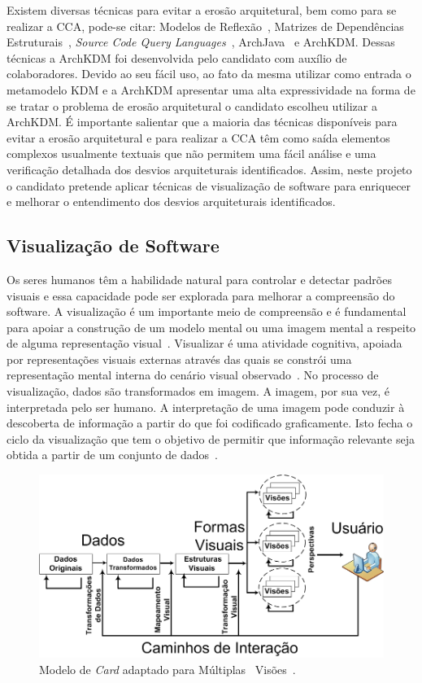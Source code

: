 \documentclass[12pt]{article}
\begin{document}
Existem diversas técnicas para evitar a erosão arquitetural, bem como para se realizar a CCA, pode-se citar: Modelos de Reflexão~\cite{Murphy_1995}, Matrizes de Dependências Estruturais~\cite{Sangal_2005}, \textit{Source Code Query Languages}~\cite{Verbaere_2008}, ArchJava~\cite{ArchJava_2202} e ArchKDM. Dessas técnicas a  ArchKDM foi desenvolvida pelo candidato com auxílio de colaboradores. Devido ao seu fácil uso, ao fato da mesma utilizar como entrada o metamodelo KDM e a ArchKDM apresentar uma alta expressividade na forma de se tratar o problema de erosão arquitetural o candidato escolheu utilizar a ArchKDM. É importante salientar que a maioria das técnicas disponíveis para evitar a erosão arquitetural e para realizar a CCA têm como saída elementos complexos usualmente textuais que não permitem uma fácil análise e uma verificação detalhada dos desvios arquiteturais identificados. Assim, neste projeto o candidato pretende aplicar técnicas de visualização de software para enriquecer e melhorar o entendimento dos desvios arquiteturais identificados.  

\subsection{Visualização de Software}

Os seres humanos têm a habilidade natural para controlar e detectar padrões visuais e essa capacidade pode ser explorada para melhorar a compreensão do software. A visualização é um importante meio de compreensão e é fundamental para apoiar a construção de um modelo mental ou uma imagem mental a respeito de alguma representação visual~\cite{spence2014information}. Visualizar é uma atividade cognitiva, apoiada por representações visuais externas através das quais se constrói uma representação mental interna do cenário visual observado~\cite{spence2014information, ware2012information}. No processo de visualização, dados são transformados em imagem. A imagem, por sua vez, é interpretada pelo ser humano. A interpretação de uma imagem pode conduzir à descoberta de informação a partir do que foi codificado graficamente. Isto fecha o ciclo da visualização que tem o objetivo de permitir que informação relevante seja obtida a partir de um conjunto de dados~\cite{source_miner_glauco}. 

\begin{figure}[h]
 \centering
 \includegraphics[scale=0.39]{image.png}
 \caption{Modelo de \textit{Card} adaptado para Múltiplas~ Visões~\cite{source_miner_glauco}.}
 \label{fig:modelo_card}
\end{figure}
\end{document}
